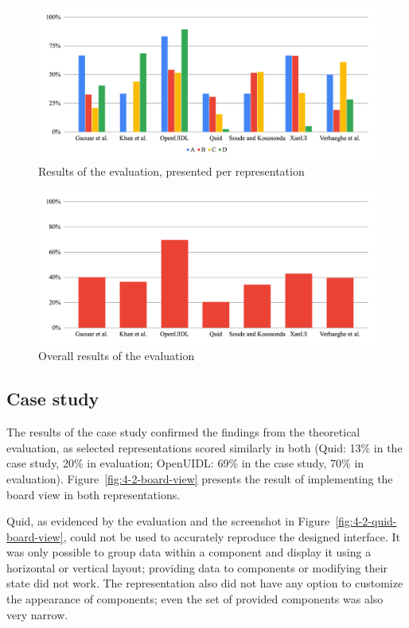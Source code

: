 \begin{figure}
    \centering
    \includegraphics[width=\textwidth]{4-results-and-discussion/results-per-representation}
    \caption{Results of the evaluation, presented per representation}
    \label{fig:4-2-results-per-representation}
\end{figure}

\begin{figure}
    \centering
    \includegraphics[width=\textwidth]{4-results-and-discussion/results-total}
    \caption{Overall results of the evaluation}
    \label{fig:4-2-results-total}
\end{figure}

\subsection{Case study}\label{subsec:case-study}
The results of the case study confirmed the findings from the theoretical evaluation, as selected representations scored similarly in both (Quid: 13\% in the case study, 20\% in evaluation; OpenUIDL: 69\% in the case study, 70\% in evaluation).
Figure~\ref{fig:4-2-board-view} presents the result of implementing the board view in both representations.

Quid, as evidenced by the evaluation and the screenshot in Figure~\ref{fig:4-2-quid-board-view}, could not be used to accurately reproduce the designed interface.
It was only possible to group data within a component and display it using a horizontal or vertical layout; providing data to components or modifying their state did not work.
The representation also did not have any option to customize the appearance of components; even the set of provided components was also very narrow.

